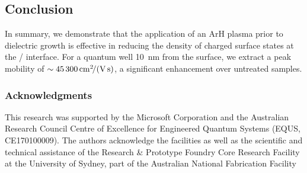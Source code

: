 \subsection{Conclusion}
In summary, we demonstrate that the application of an ArH plasma prior to dielectric growth is effective in reducing the density of charged surface states at the / interface. For a quantum well \SI{10}{\nano\meter} from the surface, we extract a peak mobility of $\sim \mob{45300}$, a significant enhancement over untreated samples.

\subsubsection{Acknowledgments}
This research was supported by the Microsoft Corporation and the Australian Research Council Centre of Excellence for Engineered Quantum Systems (EQUS, CE170100009). The authors acknowledge the facilities as well as the scientific and technical assistance of the Research \& Prototype Foundry Core Research Facility at the University of Sydney, part of the Australian National Fabrication Facility

